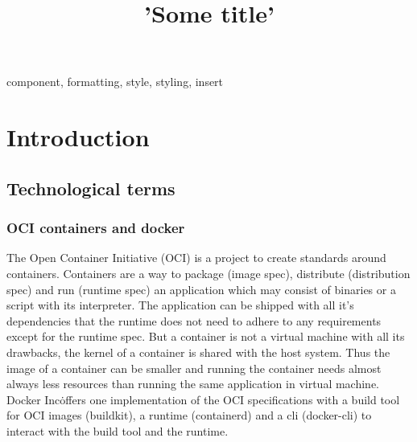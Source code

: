 \documentclass[conference]{IEEEtran}
\begin{document}
\title{'Some title'}

\author{
}

\maketitle

\begin{abstract}
	
\end{abstract}

\begin{IEEEkeywords}
	component, formatting, style, styling, insert
\end{IEEEkeywords}

\section{Introduction}

\subsection{Technological terms}

\subsubsection{OCI containers and docker}

The Open Container Initiative (OCI) is a project to create standards around containers\cite{oci-webiste}.
Containers are a way to package (image spec), distribute (distribution spec) and run (runtime spec) an application
which may consist of binaries or a script with its interpreter.
The application can be shipped with all it's dependencies that the runtime does not need to adhere to any
requirements except for the runtime spec.
But a container is not a virtual machine with all its drawbacks, the kernel of a container is shared with the host system.
Thus the image of a container can be smaller and running the container needs almost always less resources than running the same application
in virtual machine.
Docker Inc\. offers one implementation of the OCI specifications with a build tool for OCI images (buildkit), a runtime (containerd)
and a cli (docker-cli) to interact with the build tool and the runtime\cite{docker-container-runtime-website}.
\end{document}
